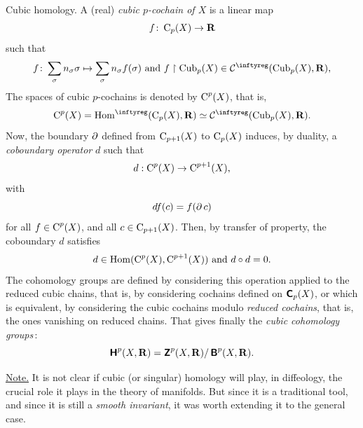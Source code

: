 \begin{Article}{Cubic homology.}{}
  A (real) \emph{cubic $p$-cochain of $X$} is a linear map
  $$%
    f \colon \DChains{p}(X) \to \RR
  $$%
  such that
  $$%
    f \colon \sum_{\sigma} n_\sigma \sigma \mapsto \sum_{\sigma} n_\sigma f(\sigma)
    \SpacedText{and}
    f \restriction \DCubes{p}(X) \in \Cinfty(\DCubes{p}(X),\RR),
  $$%
  The spaces of cubic $p$-cochains is denoted by $\operatorname{C}^{p}(X)$,
  that is,
  $$%
    \DCochains{p}(X) = \DHom(\DChains{p}(X),\RR) \simeq  \Cinfty(\DCubes{p}(X),\RR).
  $$%
  Now,
  the boundary $\operatorname{\partial}$ defined from $\operatorname{C}_{p+1}(X)$ to $\operatorname{C}_{p}(X)$ induces,
  by duality,
  a {\em coboundary operator} $d$ such that
  $$%
    d : \DCochains{p}(X) \to  \DCochains{p+1}(X),
  $$%
  with
  $$%
    df(c) = f(\Boundary c)
  $$%
  for all $f \in \operatorname{C}^{p}(X)$,
  and all $c \in \operatorname{C}_{p+1}(X)$.
  Then,
  by transfer of property,
  the coboundary $d$ satisfies
  $$%
    d \in \Hom(\DCochains{p}(X),\DCochains{p+1}(X))
    \SpacedText{and} d \circ d = 0.
  $$%
  The cohomology groups are defined by considering this operation applied to the reduced cubic chains,
  that is,
  by considering cochains defined on $\operatorname{\textbf{\textsf C}}_{p}(X)$,
  or which is equivalent,
  by considering the cubic cochains modulo \emph{reduced cochains},
  that is,
  the ones vanishing on reduced chains.
  That gives finally the \emph{cubic cohomology groups}\,:
  $$%
    \QDH^p(X,\RR) = \QDZ^p(X,\RR)/\QDB^p(X,\RR).
  $$%

  \uline{Note.} It is not clear if cubic (or singular) homology will play,
  in diffeology,
  the crucial role it plays in the theory of manifolds.
  But since it is a traditional tool,
  and since it is still a \emph{smooth invariant},
  it was worth extending it to the general case.
\end{Article} %

